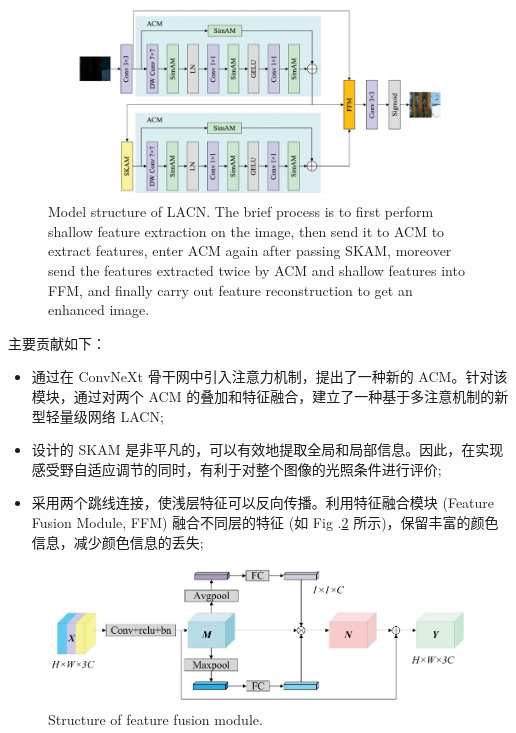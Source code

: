 \documentclass[a4paper, 10pt]{article}
\begin{document}
			\begin{figure}[htbp]
				\centering 
				\includegraphics[width=\columnwidth]{picture/LLIE/LACN/LACN model structure}
				\caption{
					\label{fig: LACN model structure} 
					Model structure of LACN. The brief process is to first perform shallow feature extraction on the image, then send it to ACM to extract features, enter ACM again after passing SKAM, moreover send the features extracted twice by ACM and shallow features into FFM, and finally carry out feature reconstruction to get an enhanced image.
				}
			\end{figure}
			
			主要贡献如下：
			
			\begin{itemize}
				\item[(1)] 
				通过在 ConvNeXt 骨干网中引入注意力机制，提出了一种新的 ACM。针对该模块，通过对两个 ACM 的叠加和特征融合，建立了一种基于多注意机制的新型轻量级网络 LACN;
				
				\item[(2)]
				设计的 SKAM 是非平凡的，可以有效地提取全局和局部信息。因此，在实现感受野自适应调节的同时，有利于对整个图像的光照条件进行评价;
				
				\item[(3)]
				采用两个跳线连接，使浅层特征可以反向传播。利用特征融合模块 (Feature Fusion Module, FFM) 融合不同层的特征 (如 Fig .\ref{fig: FFM structure} 所示)，保留丰富的颜色信息，减少颜色信息的丢失;
			\end{itemize}	
			
			\begin{figure}[htbp]
				\centering 
				\includegraphics[width=0.8\columnwidth]{picture/LLIE/LACN/FFM structure}
				\caption{
					\label{fig: FFM structure} 
					Structure of feature fusion module.
				}
			\end{figure}
			
\end{document}
